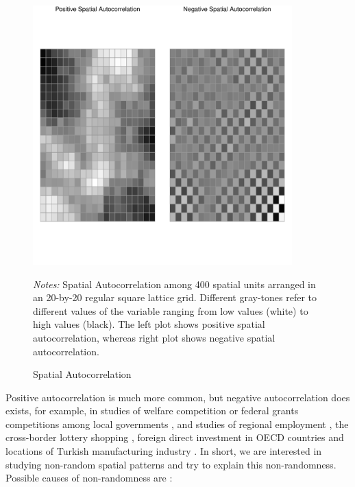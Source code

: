 \begin{figure}[ht]
  \caption{Spatial Autocorrelation}
    \label{fig:Autocorrelation}
    \centering
    	\begin{minipage}{1\linewidth}
\begin{knitrout}
\color{fgcolor}

{\centering \includegraphics[width=10cm,height=10cm]{figure/Autocorrelation-1} 

}


\end{knitrout}
\footnotesize
		\emph{Notes:} Spatial Autocorrelation among 400 spatial units arranged in an 20-by-20 regular square lattice grid. Different gray-tones refer to different values of the variable ranging from low values (white) to high values (black). The left plot shows positive spatial autocorrelation, whereas right plot shows negative spatial autocorrelation. 
	\end{minipage}	
\end{figure}

Positive autocorrelation is much more common, but negative autocorrelation does exists, for example, in studies of welfare competition or federal grants competitions among local governments \citep{saavedra2000model, boarnet2002federal}, and studies of regional employment \citep{filiztekin2009regional, pavlyuk2011spatial}, the cross-border lottery shopping \citep{garrett2002revenue}, foreign direct investment in OECD countries \citep{garretsen2009fdi} and locations of Turkish manufacturing industry \citep{basdas2009spatial}. In short, we are interested in studying non-random spatial patterns and try to explain this non-randomness. Possible causes of non-randomness are \citep{gibbons2015spatial}:

